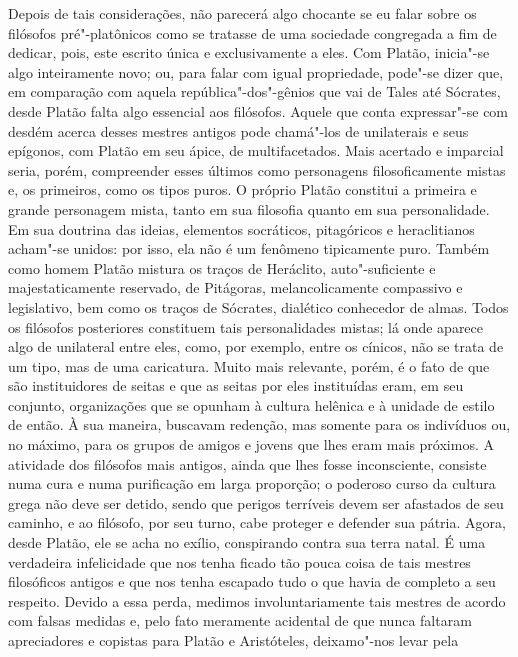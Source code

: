 Depois de tais considerações, não parecerá algo chocante se eu falar sobre os
filósofos pré"-platônicos como se tratasse de uma sociedade congregada a fim
de dedicar, pois, este escrito única e exclusivamente a eles. Com Platão,
inicia"-se algo inteiramente novo; ou, para falar \label{complatao} com igual
propriedade, pode"-se dizer que, em comparação com aquela
república"-dos"-gênios que vai de Tales até Sócrates, desde Platão falta algo
essencial aos filósofos. Aquele que conta expressar"-se com desdém acerca
desses mestres antigos pode chamá"-los de unilaterais e seus epígonos, com
Platão em seu ápice, de multifacetados. Mais acertado e imparcial seria,
porém, compreender esses últimos como personagens filosoficamente mistas e,
os primeiros, como os tipos puros. O próprio Platão constitui a primeira e
grande personagem mista, tanto em sua filosofia quanto em sua personalidade.
Em sua doutrina das ideias, elementos socráticos, pitagóricos e heraclitianos
acham"-se unidos: por isso, ela não é um fenômeno tipicamente puro. Também
como homem Platão mistura os traços de Heráclito, auto"-suficiente e
majestaticamente reservado, de Pitágoras, melancolicamente compassivo e
legislativo, bem como os traços de Sócrates, dialético conhecedor de almas.
Todos os filósofos posteriores constituem tais personalidades mistas; lá onde
aparece algo de unilateral entre eles, como, por exemplo, entre os cínicos,
não se trata de um tipo, mas de uma caricatura. Muito mais relevante, porém,
é o fato de que são instituidores de seitas e que as seitas por eles
instituídas eram, em seu conjunto, organizações que se opunham à cultura
helênica e à unidade de estilo de então. À sua maneira, buscavam redenção,
mas somente para os indivíduos ou, no máximo, para os grupos de amigos e
jovens que lhes eram mais próximos. A atividade dos filósofos mais antigos,
ainda que lhes fosse inconsciente, consiste numa cura e numa purificação em
larga proporção; o poderoso curso da cultura grega não deve ser detido, sendo
que perigos terríveis devem ser afastados de seu caminho, e ao filósofo, por
seu turno, cabe proteger e defender sua pátria. Agora, desde Platão, ele se
acha no exílio, conspirando contra sua terra natal. É uma verdadeira
infelicidade que nos tenha ficado tão pouca coisa de tais mestres filosóficos
antigos e que nos tenha escapado tudo o que havia de completo a seu respeito.
Devido a essa perda, medimos involuntariamente tais mestres de acordo com
falsas medidas e, pelo fato meramente acidental de que nunca faltaram
apreciadores e copistas para Platão e Aristóteles, deixamo"-nos levar pela
